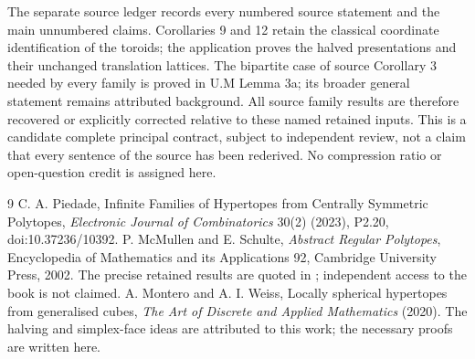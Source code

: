 The separate source ledger records every numbered source statement and the main unnumbered claims. Corollaries 9 and 12 retain the classical coordinate identification of the toroids; the application proves the halved presentations and their unchanged translation lattices. The bipartite case of source Corollary 3 needed by every family is proved in U.M Lemma 3a; its broader general statement remains attributed background. All source family results are therefore recovered or explicitly corrected relative to these named retained inputs. This is a candidate complete principal contract, subject to independent review, not a claim that every sentence of the source has been rederived. No compression ratio or open-question credit is assigned here.

\begin{thebibliography}{9}
 C. A. Piedade, Infinite Families of Hypertopes from Centrally Symmetric Polytopes, \emph{Electronic Journal of Combinatorics} 30(2) (2023), P2.20, doi:10.37236/10392.
 P. McMullen and E. Schulte, \emph{Abstract Regular Polytopes}, Encyclopedia of Mathematics and its Applications 92, Cambridge University Press, 2002. The precise retained results are quoted in \cite{P}; independent access to the book is not claimed.
 A. Montero and A. I. Weiss, Locally spherical hypertopes from generalised cubes, \emph{The Art of Discrete and Applied Mathematics} (2020). The halving and simplex-face ideas are attributed to this work; the necessary proofs are written here.
\end{thebibliography}
